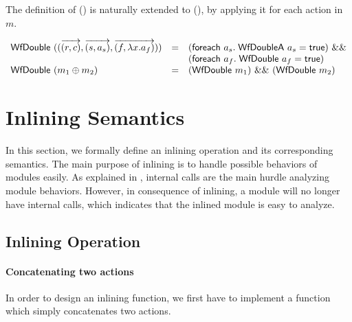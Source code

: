 The definition of () is naturally extended to
(), by applying it for each action in $m$.

\begin{definition}
  \label{def-wfdouble}
  \mbox{}
  \begin{center}
    \begin{math}
      \begin{array}{lcl}
        \wfdouble{(\modbasic{\regpair{r}{c}}{\rulepair{s}{a_s}}{\methodpair{f}{\lambda x.a_f}})} & =
        & (\wordforeach{} a_s.\; \wfdoublea{a_s} = \btrue)\ \band{} \\
        & & (\wordforeach{} a_f.\; \wfdouble{a_f} = \btrue) \\
        \wfdouble{(\modcomp{m_1}{m_2})} & = & (\wfdouble{m_1})\ \band{}\ (\wfdouble{m_2}) \\
      \end{array}
    \end{math}
  \end{center}
\end{definition}

\section{Inlining Semantics}
\label{sec:inlining-semantics}

In this section, we formally define an inlining operation and its
corresponding semantics. The main purpose of inlining is to handle
possible behaviors of modules easily. As explained in
, internal calls are the main hurdle
analyzing module behaviors. However, in consequence of inlining, a
module will no longer have internal calls, which indicates that the
inlined module is easy to analyze.

\subsection{Inlining Operation}

\paragraph{Concatenating two actions}
In order to design an inlining function, we first have to implement a
function which simply concatenates two actions.

